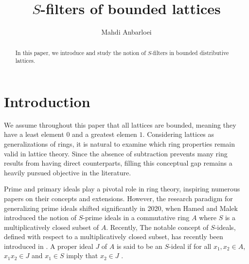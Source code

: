 \documentclass[preprint,review,10pt]{amsart}
\theoremstyle{definition}
\theoremstyle{remark}
\numberwithin{equation}{section}
\begin{document}
\title{$S$-filters of bounded lattices}


\author{Mahdi Anbarloei}
\address{Department of Mathematics, Faculty of Sciences,
Imam Khomeini International University, Qazvin, Iran.
}






 

\begin{abstract}
 In this paper, we introduce and study the notion of  $S$-filters in  bounded distributive lattices.

\end{abstract}
\maketitle

\section{Introduction} 
We assume throughout this paper that all lattices are bounded, meaning they have a least element $0$ and a greatest elemen $1$. Considering lattices as generalizations of rings, it is natural to examine which ring properties remain valid in lattice theory. Since the absence of subtraction prevents many ring results from having direct counterparts, filling this conceptual gap remains a heavily pursued objective in the literature.


Prime and primary ideals play a pivotal role in ring theory, inspiring numerous papers on their concepts and extensions. However, the research paradigm for generalizing prime ideals shifted significantly in 2020, when Hamed and Malek  introduced the notion of $S$-prime ideals in a commutative ring $A$ where $S$ is a multiplicatively closed subset of $A$.  Recently, The notable concept of $S$-ideals, defined with respect to a multiplicatively closed subset, has recently been introduced in \cite{Khashan}.   A  proper ideal $J$  of $A$ is said to be   an $S$-ideal if for all $x_1,x_2 \in A$, $x_1x_2 \in J$ and $x_1 \in S$ imply that $x_2 \in J$ \cite{Khashan}. 
\end{document}
